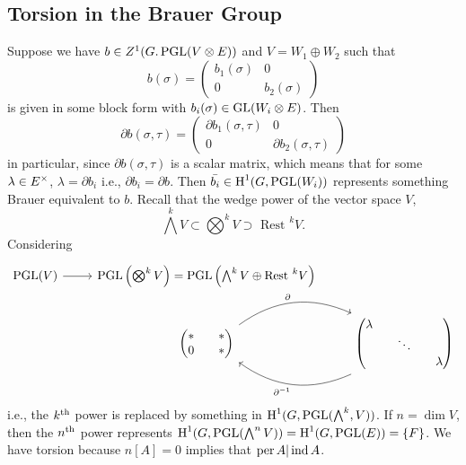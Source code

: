 \subsection{Torsion in the Brauer Group}
Suppose we have $b \in Z^1(G. \operatorname{PGL}(V \otimes E))$ and $V = W_1 \oplus W_2$ such that 
$$
b(\sigma	) = \begin{pmatrix}
b_1(\sigma) & 0 \\ 0 & b_2(\sigma)
\end{pmatrix}
$$
is given in some block form with $b_i(\sigma) \in \operatorname{GL}(W_i \otimes E)$. Then 
$$\partial b(\sigma , \tau) = 
\begin{pmatrix}
\partial b_1(\sigma , \tau) & 0 \\ 0 & \partial b_2(\sigma , \tau)
\end{pmatrix}$$
in particular, since $\partial b(\sigma , \tau)$ is a scalar matrix, which means that for some $\lambda \in E^{\times}$, $\lambda = \partial b_i$ i.e., $\partial b_i = \partial b.$ Then $\bar{b_i} \in \text{H}^1(G,\operatorname{PGL} (W_i))$ represents something Brauer equivalent to $b$. Recall that the wedge power of the vector space $V$, 
$$\bigwedge^k V \subset \bigotimes^k V \supset \text{ Rest }^kV .$$ 
Considering 
$$
\begin{tikzcd}
\PGL (V) \arrow{r} & \PGL\pwr{\bigotimes^k V} = \PGL\pwr{\bigwedge^k V \oplus \text{Rest }^k V} & {}\\
{} & 
\begin{pmatrix}
* & * \\ 0 & * 
\end{pmatrix} \arrow[bend left]{r}{\partial} & 
\begin{pmatrix}
\lambda & {} & {} \\
{} & \ddots & {} \\
{} & {} & \lambda
\end{pmatrix} \arrow[bend left]{l}{\partial\inv}
\end{tikzcd} 
$$
i.e., the $k^{\text{th}}$ power is replaced by something in $\text{H}^1(G,\operatorname{PGL} (\bigwedge^k ,V))$. If $n = \dim V$, then the $n^{\text{th}}$ power represents $\text{H}^1(G,\operatorname{PGL} (\bigwedge^n  V)) = \text{H}^1(G,\operatorname{PGL} (E)) = \left\lbrace F \right\rbrace$. We have torsion because $n\left[ A \right] = 0$ implies that $\operatorname{per} A | \operatorname{ind} A$. 














